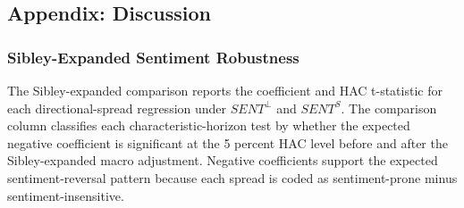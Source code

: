 \documentclass[11pt]{article}
\newcommand{\var}[1]{\ensuremath{#1}}
\begin{document}
\subsection{Appendix: Discussion}


\subsubsection{Sibley-Expanded Sentiment Robustness}


The Sibley-expanded comparison reports the coefficient and HAC t-statistic for each directional-spread regression under \var{SENT^{\perp}} and \var{SENT^{S}}. The comparison column classifies each characteristic-horizon test by whether the expected negative coefficient is significant at the 5 percent HAC level before and after the Sibley-expanded macro adjustment. Negative coefficients support the expected sentiment-reversal pattern because each spread is coded as sentiment-prone minus sentiment-insensitive.
\end{document}
